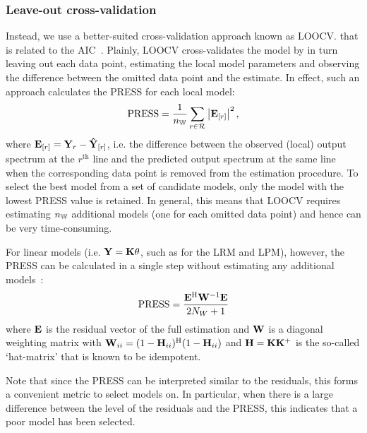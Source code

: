 \subsubsection{Leave-out cross-validation}
Instead, we use a better-suited cross-validation approach known as \gls{LOOCV}.
 that is related to the \gls{AIC}~\citep{Stone1977}.
Plainly, \gls{LOOCV} cross-validates the model by in turn leaving out each data point, estimating the local model parameters and observing the difference between the omitted data point and the estimate.
In effect, such an approach calculates the \gls{PRESS} for each local model:
\begin{equation}
 \PRESS = 
 \frac{1}{\nWind} 
  \sum_{r \in \LocalShifts{}}
  \abs{\ignoring{r}{\LocalVector{E}}}^2
    \text{,}
\label{eq:PRESS-general}
\end{equation}
where $\ignoring{r}{\LocalVector{E}} = \LocalVector{Y}_{r} - \ignoring{r}{\LocalVector{\estimated{Y}}}$, i.e. the difference between the observed (local) output spectrum at the $r^{\text{th}}$ line and the predicted output spectrum at the same line when the corresponding data point is removed from the estimation procedure.
To select the best model from a set of candidate models, only the model with the lowest \gls{PRESS} value is retained.
In general, this means that \gls{LOOCV} requires estimating $\nWind$ additional models (one for each omitted data point) and hence can be very time-consuming.

For linear models (i.e. $\LocalVector{Y} = \LocalMatrix{K} \LocalVector{\theta}$, such as for the \gls{LRM} and \gls{LPM}), however, the \gls{PRESS} can be calculated in a single step without estimating any additional models~\citep[Sec.~12.3.2]{Seber2003}:
\begin{equation}
\PRESS = \frac{\LocalVector{E}^{\HT} \LocalVector{W}^{-1} \LocalVector{E}}{2N_W + 1}
\end{equation}
where $\LocalVector{E}$ is the residual vector of the full estimation and $\LocalVector{W}$ is a diagonal weighting matrix with $\LocalVector{W}_{ii} = (1 - \LocalVector{H}_{ii})^{\HT} (1 - \LocalVector{H}_{ii})$ and
$\LocalVector{H} = \LocalMatrix{K} \pinv{\LocalMatrix{K}}$ is the so-called `hat-matrix' that is known to be idempotent.

Note that since the \gls{PRESS} can be interpreted similar to the residuals, this forms a convenient metric to select models on.
In particular, when there is a large difference between the level of the residuals and the \gls{PRESS}, this indicates that a poor model has been selected.

